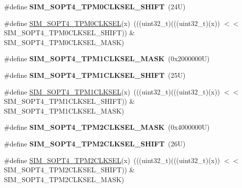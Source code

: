 \begin{DoxyCompactItemize}
\item 
\mbox{\label{group___s_i_m___register___masks_ga608eeddec48cf22911d5f5a1ea52c261}} 
\#define {\bfseries S\+I\+M\+\_\+\+S\+O\+P\+T4\+\_\+\+T\+P\+M0\+C\+L\+K\+S\+E\+L\+\_\+\+S\+H\+I\+FT}~(24\+U)
\item 
\#define \mbox{\hyperlink{group___s_i_m___register___masks_gafaa026e86fa3a9757bd3fce00954c1bb}{S\+I\+M\+\_\+\+S\+O\+P\+T4\+\_\+\+T\+P\+M0\+C\+L\+K\+S\+EL}}(x)~(((uint32\+\_\+t)(((uint32\+\_\+t)(x)) $<$$<$ S\+I\+M\+\_\+\+S\+O\+P\+T4\+\_\+\+T\+P\+M0\+C\+L\+K\+S\+E\+L\+\_\+\+S\+H\+I\+FT)) \& S\+I\+M\+\_\+\+S\+O\+P\+T4\+\_\+\+T\+P\+M0\+C\+L\+K\+S\+E\+L\+\_\+\+M\+A\+SK)
\item 
\mbox{\label{group___s_i_m___register___masks_ga049c795a05cfcabb4865bd94e9960d1c}} 
\#define {\bfseries S\+I\+M\+\_\+\+S\+O\+P\+T4\+\_\+\+T\+P\+M1\+C\+L\+K\+S\+E\+L\+\_\+\+M\+A\+SK}~(0x2000000\+U)
\item 
\mbox{\label{group___s_i_m___register___masks_gae2f48392a848aa2b9dd0f4f117682ff1}} 
\#define {\bfseries S\+I\+M\+\_\+\+S\+O\+P\+T4\+\_\+\+T\+P\+M1\+C\+L\+K\+S\+E\+L\+\_\+\+S\+H\+I\+FT}~(25\+U)
\item 
\#define \mbox{\hyperlink{group___s_i_m___register___masks_ga37f37925f9e731d2ef7619ce2b3d3a75}{S\+I\+M\+\_\+\+S\+O\+P\+T4\+\_\+\+T\+P\+M1\+C\+L\+K\+S\+EL}}(x)~(((uint32\+\_\+t)(((uint32\+\_\+t)(x)) $<$$<$ S\+I\+M\+\_\+\+S\+O\+P\+T4\+\_\+\+T\+P\+M1\+C\+L\+K\+S\+E\+L\+\_\+\+S\+H\+I\+FT)) \& S\+I\+M\+\_\+\+S\+O\+P\+T4\+\_\+\+T\+P\+M1\+C\+L\+K\+S\+E\+L\+\_\+\+M\+A\+SK)
\item 
\mbox{\label{group___s_i_m___register___masks_gad5a902a0614ee968bf5f4e8b4d619631}} 
\#define {\bfseries S\+I\+M\+\_\+\+S\+O\+P\+T4\+\_\+\+T\+P\+M2\+C\+L\+K\+S\+E\+L\+\_\+\+M\+A\+SK}~(0x4000000\+U)
\item 
\mbox{\label{group___s_i_m___register___masks_ga7e0e458665aad403b0a67a515fa08ff3}} 
\#define {\bfseries S\+I\+M\+\_\+\+S\+O\+P\+T4\+\_\+\+T\+P\+M2\+C\+L\+K\+S\+E\+L\+\_\+\+S\+H\+I\+FT}~(26\+U)
\item 
\#define \mbox{\hyperlink{group___s_i_m___register___masks_ga2d15c8a25c6561fae46fd998243841f8}{S\+I\+M\+\_\+\+S\+O\+P\+T4\+\_\+\+T\+P\+M2\+C\+L\+K\+S\+EL}}(x)~(((uint32\+\_\+t)(((uint32\+\_\+t)(x)) $<$$<$ S\+I\+M\+\_\+\+S\+O\+P\+T4\+\_\+\+T\+P\+M2\+C\+L\+K\+S\+E\+L\+\_\+\+S\+H\+I\+FT)) \& S\+I\+M\+\_\+\+S\+O\+P\+T4\+\_\+\+T\+P\+M2\+C\+L\+K\+S\+E\+L\+\_\+\+M\+A\+SK)
\end{DoxyCompactItemize}
